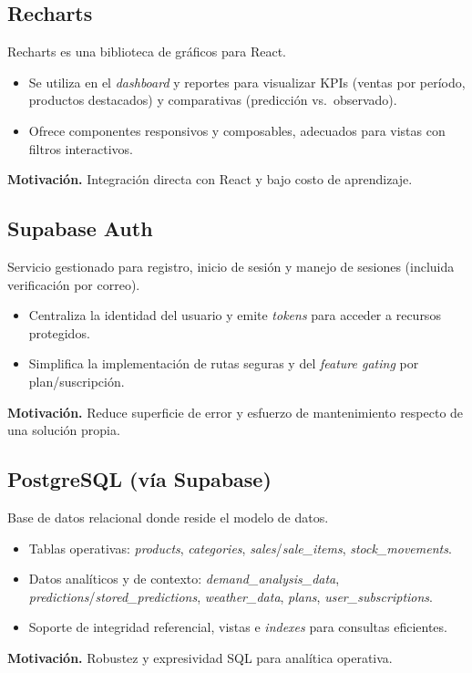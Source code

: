 \subsection{Recharts}
Recharts es una biblioteca de gráficos para React.
\begin{itemize}
    \item Se utiliza en el \textit{dashboard} y reportes para visualizar KPIs (ventas por período, productos destacados) y comparativas (predicción vs.\ observado).
    \item Ofrece componentes responsivos y composables, adecuados para vistas con filtros interactivos.
\end{itemize}
\noindent\textbf{Motivación.} Integración directa con React y bajo costo de aprendizaje.

\subsection{Supabase Auth}
Servicio gestionado para registro, inicio de sesión y manejo de sesiones (incluida verificación por correo).
\begin{itemize}
    \item Centraliza la identidad del usuario y emite \textit{tokens} para acceder a recursos protegidos.
    \item Simplifica la implementación de rutas seguras y del \textit{feature gating} por plan/suscripción.
\end{itemize}
\noindent\textbf{Motivación.} Reduce superficie de error y esfuerzo de mantenimiento respecto de una solución propia.

\subsection{PostgreSQL (vía Supabase)}
Base de datos relacional donde reside el modelo de datos.
\begin{itemize}
    \item Tablas operativas: \textit{products}, \textit{categories}, \textit{sales}/\textit{sale\_items}, \textit{stock\_movements}.
    \item Datos analíticos y de contexto: \textit{demand\_analysis\_data}, \textit{predictions}/\textit{stored\_predictions}, \textit{weather\_data}, \textit{plans}, \textit{user\_subscriptions}.
    \item Soporte de integridad referencial, vistas e \textit{indexes} para consultas eficientes.
\end{itemize}
\noindent\textbf{Motivación.} Robustez y expresividad SQL para analítica operativa.

